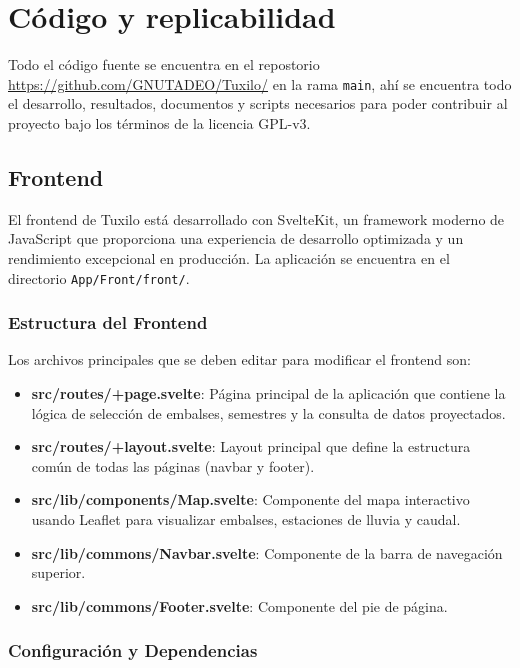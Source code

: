 \chapter{Código y replicabilidad}
\label{chp:5}


Todo el código fuente se encuentra en el repostorio \url{https://github.com/GNUTADEO/Tuxilo/} en la rama \texttt{main}, ahí se encuentra todo el desarrollo, resultados, documentos y scripts necesarios para poder contribuir al proyecto bajo los términos de la licencia GPL-v3\cite{gpl3_license}.

\section{Frontend}
\label{sec:chp5-frontend}

El frontend de Tuxilo está desarrollado con SvelteKit, un framework moderno de JavaScript que proporciona una experiencia de desarrollo optimizada y un rendimiento excepcional en producción. La aplicación se encuentra en el directorio \texttt{App/Front/front/}.

\subsection{Estructura del Frontend}

Los archivos principales que se deben editar para modificar el frontend son:

\begin{itemize}
    \item \textbf{src/routes/+page.svelte}: Página principal de la aplicación que contiene la lógica de selección de embalses, semestres y la consulta de datos proyectados.
    \item \textbf{src/routes/+layout.svelte}: Layout principal que define la estructura común de todas las páginas (navbar y footer).
    \item \textbf{src/lib/components/Map.svelte}: Componente del mapa interactivo usando Leaflet para visualizar embalses, estaciones de lluvia y caudal.
    \item \textbf{src/lib/commons/Navbar.svelte}: Componente de la barra de navegación superior.
    \item \textbf{src/lib/commons/Footer.svelte}: Componente del pie de página.
\end{itemize}

\subsection{Configuración y Dependencias}

